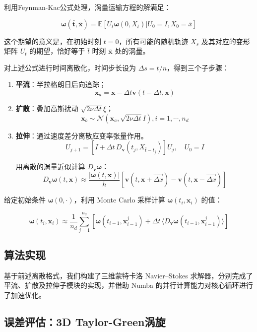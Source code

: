 \documentclass[UTF8,fontset=fandol]{ctexart}
\begin{document}
利用Feynman-Kac公式处理，涡量运输方程的解满足：

\[\mathbf{\omega(\bar{t}, \bar{x})} = \mathbb{E} [U_{\bar{t}} \mathbf{\omega}(0, X_{\bar{t}})|U_0 = I, X_0 = \bar{x}]\]

这个期望的意义是，在初始时刻 $t=0$，所有可能的随机轨迹 $X_s$ 及其对应的变形矩阵 $U_t$ 的期望，恰好等于 $\bar{t}$ 时刻 $\bar{\mathbf{x}}$ 处的涡量。

对上述公式进行时间离散化，时间步长设为 $\Delta s = t / n$，得到三个子步骤：

\begin{enumerate}
    \item \textbf{平流}：半拉格朗日后向追踪；
    \[\mathbf{x}_a = \mathbf{x} - \Delta t \mathbf{v}(t - \Delta t, \mathbf{x})\]

    \item \textbf{扩散}：叠加高斯扰动 $\sqrt{2\nu\Delta t}\xi$；
    \[\mathbf{x}_b \sim \mathcal{N} (\mathbf{x}_a , \sqrt{2\nu\Delta t} I), i = 1, \cdots, n_d\]

    \item \textbf{拉伸}：通过速度差分离散应变率张量作用。
    \[U_{j+1} = \left[ I + \Delta t \, D_{\mathbf{v}}(t_j, X_{\bar{t} - t_j}) \right] U_j, \quad U_0 = I\]

    用离散的涡量近似计算 $D_{\mathbf{v}} \boldsymbol{\omega}$：
    \[D_{\mathbf{v}} \boldsymbol{\omega}(t, \mathbf{x}) \approx \frac{|\boldsymbol{\omega}(t, \mathbf{x})|}{h} \left[ \mathbf{v}(t, \mathbf{x} + \overrightarrow{\Delta x}) - \mathbf{v}(t, \mathbf{x} - \overrightarrow{\Delta x}) \right]\]
\end{enumerate}

给定初始条件 $\mathbf{\omega}(0, \cdot)$，利用 Monte Carlo 采样计算 $\boldsymbol{\omega}(t_i, \mathbf{x}_i)$ 的值：

\[\boldsymbol{\omega}(t_i, \mathbf{x}_i) \approx \frac{1}{n_d} \sum_{j=1}^{n_d} \left[ \boldsymbol{\omega}(t_{i-1}, \mathbf{x}_{i-1}^j) + \Delta t \, \langle D_{\mathbf{v}} \boldsymbol{\omega}(t_{i-1}, \mathbf{x}_{i-1}^j) \rangle \right]\]

\subsection{算法实现}

基于前述离散格式，我们构建了三维蒙特卡洛 Navier–Stokes 求解器，分别完成了平流、扩散及拉伸子模块的实现，并借助 Numba 的并行计算能力对核心循环进行了加速优化。

\subsection{误差评估：3D Taylor-Green涡旋}
\end{document}
